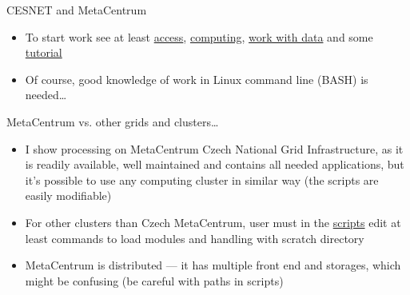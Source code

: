 \documentclass[compress,  xelatex, 11pt, xcolor=x11names, aspectratio=169,
	hyperref={
		bookmarks=true,
		unicode=true,
		colorlinks=true,
		pdftitle={HybSeq course},
		plainpages=false,
		pdfauthor={Vojtech Zeisek},
		pdfsubject={Practical processing of HybSeq target enrichment sequencing data on computing grids like MetaCentrum},
		pdfcreator={XeLaTeX},
		pdfkeywords={BASH, command line, GNU, HybSeq, Linux, MetaCentrum, sequencing shell, target enrichment},
		linkcolor=Turquoise4, %
		anchorcolor=DodgerBlue4, %
		citecolor=DodgerBlue4, %
		filecolor=DodgerBlue4, %
		menucolor=Tan4, %
		urlcolor=DarkOliveGreen4 %
		},
	url={hyphens, lowtilde} %
	]{beamer}
\begin{document}
\begin{frame}[allowframebreaks]{CESNET and MetaCentrum}
\begin{itemize}
\begin{itemize}
		\end{itemize}
		\item To start work see at least \href{https://docs.metacentrum.cz/access/log-in/}{access}, \href{https://docs.metacentrum.cz/computing/}{computing}, \href{https://docs.metacentrum.cz/data/data-within/}{work with data} and some \href{https://docs.metacentrum.cz/tutorials/}{tutorial}
		\item Of course, good knowledge of work in Linux command line (BASH) is needed\ldots
	\end{itemize}
	\vfill
	\begin{alertblock}{MetaCentrum vs. other grids and clusters\ldots}
	\begin{itemize}
		\item I show processing on MetaCentrum Czech National Grid Infrastructure, as it is readily available, well maintained and contains all needed applications, but it's possible to use any computing cluster in similar way (the scripts are easily modifiable)
		\item For other clusters than Czech MetaCentrum, user must in the \href{https://github.com/V-Z/hybseq-scripts}{scripts} edit at least commands to load modules and handling with scratch directory
		\item MetaCentrum is distributed --- it has multiple front end and storages, which might be confusing (be careful with paths in scripts)
	\end{itemize}
	\end{alertblock}
	\vfill
\end{frame}
\end{document}
